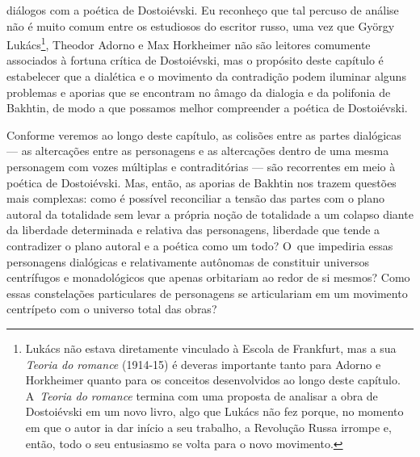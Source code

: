 diálogos com a poética de Dostoiévski. Eu reconheço que tal percuso de
análise não é muito comum entre os estudiosos do escritor russo, uma vez
que György Lukács\footnote{Lukács não estava diretamente vinculado à
  Escola de Frankfurt, mas a sua \emph{Teoria do romance} (1914-15) é
  deveras importante tanto para Adorno e Horkheimer quanto para os
  conceitos desenvolvidos ao longo deste capítulo. A~\emph{Teoria do
  romance} termina com uma proposta de analisar a obra de Dostoiévski em
  um novo livro, algo que Lukács não fez porque, no momento em que o
  autor ia dar início a seu trabalho, a Revolução Russa irrompe e,
  então, todo o seu entusiasmo se volta para o novo movimento.}, Theodor
Adorno e Max Horkheimer não são leitores comumente associados à fortuna
crítica de Dostoiévski, mas o propósito deste capítulo é estabelecer que
a dialética e o movimento da contradição podem iluminar alguns problemas
e aporias que se encontram no âmago da dialogia e da polifonia de
Bakhtin, de modo a que possamos melhor compreender a poética de
Dostoiévski.

Conforme veremos ao longo deste capítulo, as colisões entre as partes
dialógicas --- as altercações entre as personagens e as altercações
dentro de uma mesma personagem com vozes múltiplas e contraditórias ---
são recorrentes em meio à poética de Dostoiévski. Mas, então, as aporias
de Bakhtin nos trazem questões mais complexas: como é possível
reconciliar a tensão das partes com o plano autoral da totalidade sem
levar a própria noção de totalidade a um colapso diante da liberdade
determinada e relativa das personagens, liberdade que tende a
contradizer o plano autoral e a poética como um todo? O~que impediria
essas personagens dialógicas e relativamente autônomas de constituir
universos centrífugos e monadológicos que apenas orbitariam ao redor de
si mesmos? Como essas constelações particulares de personagens se
articulariam em um movimento centrípeto com o universo total das obras?

